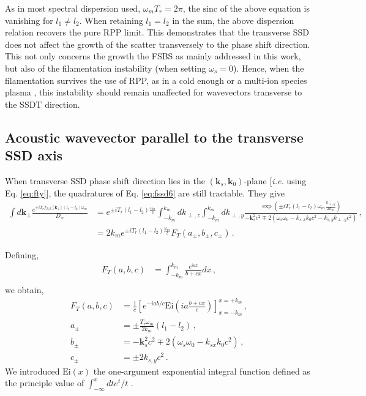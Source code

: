 \documentclass[
 reprint,
 amsmath,amssymb,
 aps,
]{revtex4-1}
\begin{document}
\begin{widetext}
As in most spectral dispersion used, $\omega_mT_r = 2\pi $, the $\mathrm{sinc}$ of the above equation is vanishing for  $l_1\neq l_2$. When retaining $l_1=l_2$ in the sum, the above dispersion relation recovers the pure RPP limit. This demonstrates that the transverse SSD does not affect the growth of the  scatter  transversely to the phase shift direction. This not only concerns the growth the FSBS as mainly  addressed in this work, but also of the filamentation instability (when setting $\omega_s=0$). Hence, when the filamentation survives the use of RPP, as in a cold enough   or a multi-ion species plasma \cite[]{Ruyer_FSBS}, this instability should remain unaffected for wavevectors transverse to the SSDT direction.

\subsection{Acoustic wavevector parallel to the transverse SSD axis}\label{sec:ssdty}
When transverse SSD phase shift direction lies in the $(\mathbf{k}_s,\mathbf{k}_0)$-plane [\emph{i.e.} using Eq. \eqref{eq:fty}], the quadratures of Eq. \eqref{eq:fssd6} are still tractable. They give
\begin{align}
 \int d\mathbf{k}_\perp 
     \frac{  e^{ \pm  iT_{r}f_{T/L}[\mathbf{k}_\perp]  (l_1-l_2) \omega_m }
     }{D_\mp}&=  e^{\pm iT_{r} (l_1-l_2)\frac{ \omega_m}{2} }
      \int_{-k_m}^{k_m} dk_{\perp,z} \int_{-k_m}^{k_m} dk_{\perp,y}\frac{  \exp\left( \pm  iT_{r}  (l_1-l_2)\omega_m \frac{k_{\perp,y}}{2k_m}  \right)
     }{- \mathbf{k}_s^2c^2 \mp 2(\omega_s\omega_{0} - k_{s,x}   k_0 c^2 - k_{s,y} k_{\perp,y} c^2) }
   \, ,\label{eq:int1}  \nonumber \\
   &=2k_m e^{\pm iT_{r} (l_1-l_2)\frac{ \omega_m}{2} } F_T(a_\pm,b_\pm,c_\pm) \, .
\end{align}

Defining,
\begin{align}
    F_T(a,b,c)&= \int_{-k_m}^{k_m} \frac{e^{iax}}{b+cx}dx\, ,\\
\end{align}
we obtain,
\begin{align}
     F_T(a,b,c) &  = \frac{1}{c}\left[
    e^{-iab/c}\mathrm{Ei}\left(ia\frac{b+cx}{c}\right)
    \right]_{x=-k_m}^{x=+k_m}\, ,\label{eq:fabc}\\
    a_\pm&=\pm\frac{T_r\omega_m}{2k_m}(l_1-l_2)\, ,\label{eq:fa}\\
    b_\pm&=- \mathbf{k}_s^2c^2 \mp 2( \omega_s\omega_{0}-k_{sx}k_0c^2 )\, ,\label{eq:fb} \\
    c_\pm&=\pm 2 k_{s,y}c^2\, .\label{eq:fc}
\end{align}
We introduced $\mathrm{Ei}(x)$ the one-argument exponential integral function defined as the principle value of $\int_{-\infty}^x dt e^{t}/t$ \cite[]{Abramowitz}. 


\end{widetext}
\end{document}
